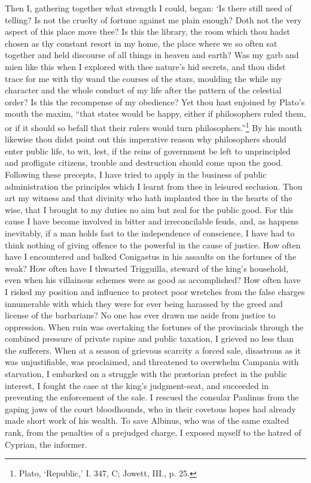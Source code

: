 \documentclass[12pt]{book}
\begin{document}
Then I, gathering together what strength I could, began: `Is there still
need of telling? Is not the cruelty of fortune against me plain enough?
Doth not the very aspect of this place move thee? Is this the library,
the room which thou hadst chosen as thy constant resort in my home, the
place where we so often sat together and held discourse of all things in
heaven and earth? Was my garb and mien like this when I explored with
thee nature's hid secrets, and thou didst trace for me with thy wand
the courses of the stars, moulding the while my character and the whole
conduct of my life after the pattern of the celestial order? Is this the
recompense of my obedience? Yet thou hast enjoined by Plato's mouth the
maxim, ``that states would be happy, either if philosophers ruled them,
or if it should so befall that their rulers would turn philosophers.''\footnote{Plato, ‘Republic,’ I. 347, C; Jowett, III., p. 25.} By
his mouth likewise thou didst point out this imperative reason why
philosophers should enter public life, to wit, lest, if the reins of
government be left to unprincipled and profligate citizens, trouble and
destruction should come upon the good. Following these precepts, I have
tried to apply in the business of public administration the principles
which I learnt from thee in leisured seclusion. Thou art my witness and
that divinity who hath implanted thee in the hearts of the wise, that I
brought to my duties no aim but zeal for the public good. For this cause
I have become involved in bitter and irreconcilable feuds, and, as
happens inevitably, if a man holds fast to the independence of
conscience, I have had to think nothing of giving offence to the
powerful in the cause of justice. How often have I encountered and
balked Conigastus in his assaults on the fortunes of the weak? How often
have I thwarted Trigguilla, steward of the king's household, even when
his villainous schemes were as good as accomplished? How often have I
risked my position and influence to protect poor wretches from the false
charges innumerable with which they were for ever being harassed by the
greed and license of the barbarians? No one has ever drawn me aside from
justice to oppression. When ruin was overtaking the fortunes of the
provincials through the combined pressure of private rapine and public
taxation, I grieved no less than the sufferers. When at a season of
grievous scarcity a forced sale, disastrous as it was unjustifiable, was
proclaimed, and threatened to overwhelm Campania with starvation, I
embarked on a struggle with the prætorian prefect in the public
interest, I fought the case at the king's judgment-seat, and succeeded
in preventing the enforcement of the sale. I rescued the consular
Paulinus from the gaping jaws of the court bloodhounds, who in their
covetous hopes had already made short work of his wealth. To save
Albinus, who was of the same exalted rank, from the penalties of a
prejudged charge, I exposed myself to the hatred of Cyprian, the
informer.
\end{document}
